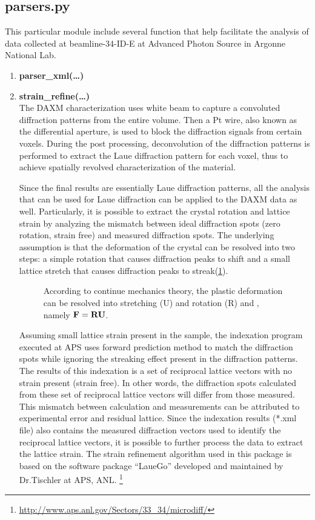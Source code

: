 \documentclass[12pt]{scrartcl}
\begin{document}
\subsection{parsers.py}
This particular module include several function that help facilitate the analysis of data collected at beamline-34-ID-E at Advanced Photon Source in Argonne National Lab.
%
\begin{enumerate}

\item \textbf{parser\_xml(\ldots)} \\

\item \textbf{strain\_refine(\ldots)} \\
The DAXM characterization uses white beam to capture a convoluted diffraction patterns from the entire volume.
Then a Pt wire, also known as the differential aperture, is used to block the diffraction signals from certain voxels.
During the post processing, deconvolution of the diffraction patterns is performed to extract the Laue diffraction pattern for each voxel, thus to achieve spatially revolved characterization of the material.

Since the final results are essentially Laue diffraction patterns, all the analysis that can be used for Laue diffraction can be applied to the DAXM data as well.
Particularly, it is possible to extract the crystal rotation and lattice strain by analyzing the mismatch between ideal diffraction spots (zero rotation, strain free) and measured diffraction spots.
The underlying assumption is that the deformation of the crystal can be resolved into two steps: a simple rotation that causes diffraction peaks to shift and a small lattice stretch that causes diffraction peaks to streak(\cref{fig:srefine}).

\begin{figure}[htp]
\centering

\caption{%
According to continue mechanics theory, the plastic deformation can be resolved into stretching (\tnsr U) and rotation (\tnsr R) and , namely $\mathbf{F} = \mathbf{R} \mathbf{U}$. }
\label{fig:srefine}
\end{figure}

Assuming small lattice strain present in the sample, the indexation program executed at APS uses forward prediction method to match the diffraction spots while ignoring the streaking effect present in the diffraction patterns.
The results of this indexation is a set of reciprocal lattice vectors with no strain present (strain free).
In other words, the diffraction spots calculated from these set of reciprocal lattice vectors will differ from those measured.
This mismatch between calculation and measurements can be attributed to experimental error and residual lattice.
Since the indexation results (*.xml file) also contains the measured diffraction vectors used to identify the reciprocal lattice vectors, it is possible to further process the data to extract the lattice strain.
The strain refinement algorithm used in this package is based on the software package ``LaueGo'' developed and maintained by Dr.Tischler at APS, ANL.
\footnote{\url{http://www.aps.anl.gov/Sectors/33_34/microdiff/}}


\end{enumerate}
\end{document}
